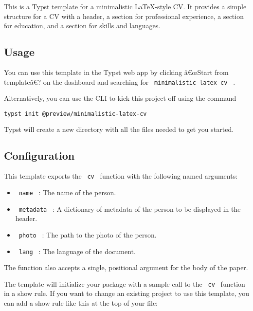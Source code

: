 \label{readme}
This is a Typst template for a minimalistic LaTeX-style CV. It provides
a simple structure for a CV with a header, a section for professional
experience, a section for education, and a section for skills and
languages.

\subsection{Usage}\label{usage}

You can use this template in the Typst web app by clicking â€œStart from
templateâ€? on the dashboard and searching for
\texttt{\ minimalistic-latex-cv\ } .

Alternatively, you can use the CLI to kick this project off using the
command

\begin{verbatim}
typst init @preview/minimalistic-latex-cv
\end{verbatim}

Typst will create a new directory with all the files needed to get you
started.

\subsection{Configuration}\label{configuration}

This template exports the \texttt{\ cv\ } function with the following
named arguments:

\begin{itemize}
\tightlist
\item
  \texttt{\ name\ } : The name of the person.
\item
  \texttt{\ metadata\ } : A dictionary of metadata of the person to be
  displayed in the header.
\item
  \texttt{\ photo\ } : The path to the photo of the person.
\item
  \texttt{\ lang\ } : The language of the document.
\end{itemize}

The function also accepts a single, positional argument for the body of
the paper.

The template will initialize your package with a sample call to the
\texttt{\ cv\ } function in a show rule. If you want to change an
existing project to use this template, you can add a show rule like this
at the top of your file:

\begin{Shaded}
\begin{Highlighting}[]

\NormalTok{  ),}
\NormalTok{)}

\end{Highlighting}
\end{Shaded}

